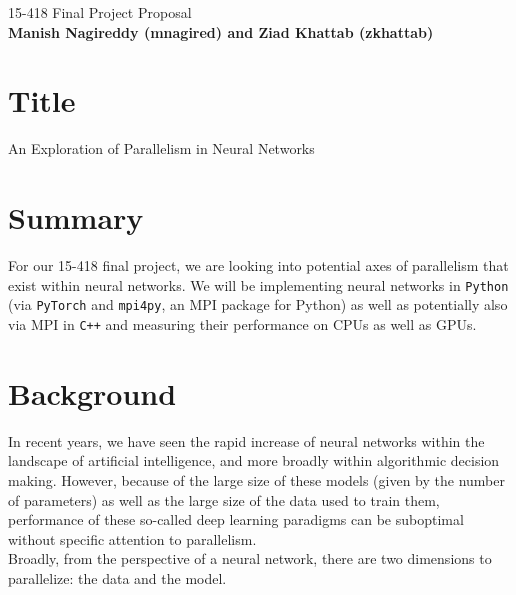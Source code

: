 \documentclass{article}
\begin{document}
\begin{center}

\Large{15-418 Final Project Proposal} \\
\vspace{1em}
\normalsize\textbf{Manish Nagireddy (mnagired) and Ziad Khattab (zkhattab)} \\
\vspace{1em}

\end{center}

\section*{Title}

An Exploration of Parallelism in Neural Networks

\section*{Summary}

For our 15-418 final project, we are looking into potential axes of parallelism that exist within neural networks. We will be implementing neural networks in \texttt{Python} (via \texttt{PyTorch} and \texttt{mpi4py}, an MPI package for Python) as well as potentially also via MPI in \texttt{C++} and measuring their performance on CPUs as well as GPUs.

\section*{Background}

In recent years, we have seen the rapid increase of neural networks within the landscape of artificial intelligence, and more broadly within algorithmic decision making. However, because of the large size of these models (given by the number of parameters) as well as the large size of the data used to train them, performance of these so-called deep learning paradigms can be suboptimal without specific attention to parallelism. \\

Broadly, from the perspective of a neural network, there are two dimensions to parallelize: the data and the model.
\end{document}
